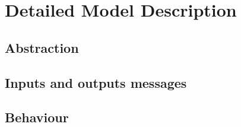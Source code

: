 \documentclass{openetcs_article}
\begin{document}

\section{Detailed Model Description}
\label{sec:deta-model-descr}
  \subsection{Abstraction}
  

  \subsection{Inputs and outputs messages}
  

  \subsection{Behaviour}
  \label{subsec:behavior}
  

%  




\end{document}
